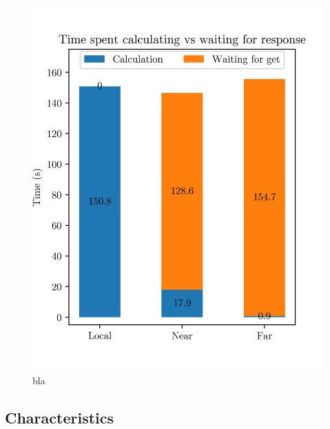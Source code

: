 \begin{figure}[t]
    \centering
    \includegraphics[scale=1]{chapters/evaluation/figures/bar_local_near_far_compare.png}
    \caption{bla}
    \label{fig:bar_local_near_far}
\end{figure}


\subsection{Characteristics}










